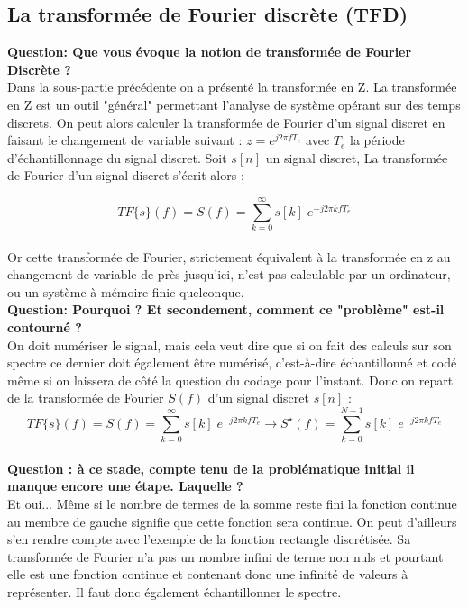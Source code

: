 \documentclass[11pt,a4paper]{article}
\begin{document}
\subsection{La transformée de Fourier discrète (TFD)}

\textbf{Question: Que vous évoque la notion de transformée de Fourier Discrète ?}\\

Dans la sous-partie précédente on a présenté la transformée en Z. La transformée en Z est un outil "général" permettant l'analyse de système  opérant sur des temps discrets. On peut alors calculer la transformée de Fourier d'un signal discret en faisant le changement de variable suivant : $z = e^{j2\pi f T_e}$ avec $T_e$ la période d'échantillonnage du signal discret. Soit $s[n]$ un signal discret, La transformée de Fourier d'un signal discret s'écrit alors : 

\[ TF\lbrace s \rbrace(f) = S(f) = \sum_{k = 0}^{\infty} s[k] \; e^{-j 2 \pi k f T_e}\] \\

Or cette transformée de Fourier, strictement équivalent à la transformée en z au changement de variable de près jusqu'ici, n'est pas calculable par un ordinateur, ou un système à mémoire finie quelconque.\\

\textbf{Question: Pourquoi ? Et secondement,  comment ce "problème" est-il contourné ?}\\

On doit numériser le signal, mais cela veut dire que si on fait des calculs sur son spectre ce dernier doit également être numérisé, c'est-à-dire échantillonné et codé même si on laissera de côté la question du codage pour l'instant. Donc on repart de la transformée de Fourier $S(f)$ d'un signal discret $s[n]$ :\\

\[ TF\lbrace s \rbrace(f) = S(f) = \sum_{k = 0}^{\infty} s[k] \; e^{-j 2 \pi k f T_e} \rightarrow S^{\star} (f) =  \sum_{k = 0}^{N-1} s[k] \; e^{-j 2 \pi k f T_e} \]\\


\textbf{Question : à ce stade, compte tenu de la problématique initial il manque encore une étape. Laquelle ?}\\

Et oui... Même si le nombre de termes de la somme reste fini la fonction continue au membre de gauche signifie que cette fonction sera continue. On peut d'ailleurs s'en rendre compte avec l'exemple de la fonction rectangle discrétisée. Sa transformée de Fourier n'a pas un nombre infini de terme non nuls et pourtant elle est une fonction continue et contenant donc une infinité de valeurs à représenter. Il faut donc également échantillonner le spectre.\\
\end{document}

